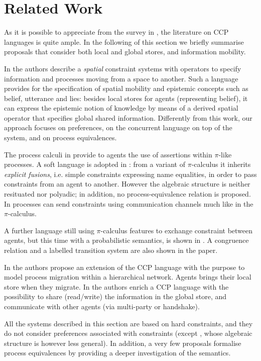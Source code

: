 \documentclass{llncs}
\begin{document}
\section{Related Work}\label{sec:related}
As it is possible to appreciate from the survey in \cite{emerging}, the literature on CCP languages is quite ample. In the following of this section  we briefly summarise proposals that consider both local and global stores, and information mobility.

In \cite{spatialvalencia} the authors describe a \emph{spatial} constraint systems with operators to
specify information and processes moving from a space to another. Such a language provides for the specification of spatial mobility and epistemic concepts such as belief, utterance and lies: besides local stores for agents  (representing belief), it can express the epistemic notion of knowledge by means of a derived spatial operator that specifies global shared information. Differently from this work, our approach focuses on preferences, on the concurrent language on top of the system, and on process equivalences.

The process calculi in \cite{parrowlics,buscemi} provide  to agents the use of assertions within $\pi$-like processes. A soft language is adopted in \cite{buscemi}: from a variant of $\pi$-calculus it inherits \emph{explicit fusions}, i.e. simple constraints expressing name equalities, in order to pass constraints from an agent to another.
 However the algebraic structure is neither resituated nor  polyadic; in addition, no process-equivalence relation is proposed.  In \cite{pi1,pi2}  processes can send constraints using communication channels much like in the $\pi$-calculus. 
 
 A further language still using $\pi$-calculus features to exchange constraint between agents, but this time with a probabilistic semantics, is shown in \cite{bortolussi}. A congruence relation and a labelled transition system are also shown in the paper. 

In \cite{catuscia} the authors propose an extension of the CCP language with the purpose to model process migration within a hierarchical network. Agents brings their local store when they migrate. In \cite{lubos} the authors enrich a CCP language with the possibility to share (read/write) the information in the global store, and communicate with other agents (via multi-party or handshake).

All the systems described in this section are based on hard constraints, and  they do not consider preferences associated with constraints (except \cite{buscemi}, whose algebraic structure is however less general). In addition, a very few proposals formalise process equivalences by providing a deeper investigation of the semantics.
\end{document}
